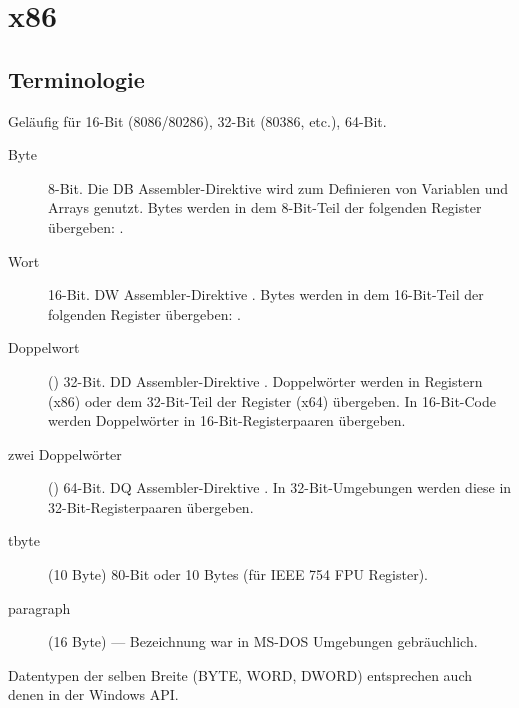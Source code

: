 \section{x86}

\subsection{Terminologie}

Geläufig für 16-Bit (8086/80286), 32-Bit (80386, etc.), 64-Bit.

\begin{description}
	\item[Byte] 8-Bit.
		Die DB Assembler-Direktive wird zum Definieren von Variablen und Arrays genutzt.
		Bytes werden in dem 8-Bit-Teil der folgenden Register übergeben:
		.
	\item[Wort] 16-Bit.
		DW Assembler-Direktive \dittoclosing.
		Bytes werden in dem 16-Bit-Teil der folgenden Register übergeben:
			.
	\item[Doppelwort] () 32-Bit.
		DD Assembler-Direktive \dittoclosing.
		Doppelwörter werden in Registern (x86) oder dem 32-Bit-Teil der Register (x64) übergeben.
		In 16-Bit-Code werden Doppelwörter in 16-Bit-Registerpaaren übergeben.
	\item[zwei Doppelwörter] () 64-Bit.
		DQ Assembler-Direktive \dittoclosing.
		In 32-Bit-Umgebungen werden diese in 32-Bit-Registerpaaren übergeben.
	\item[tbyte] (10 Byte) 80-Bit oder 10 Bytes (für IEEE 754 FPU Register).
	\item[paragraph] (16 Byte) --- Bezeichnung war in MS-DOS Umgebungen gebräuchlich.
\end{description}


Datentypen der selben Breite (BYTE, WORD, DWORD) entsprechen auch denen in der Windows \ac{API}.


